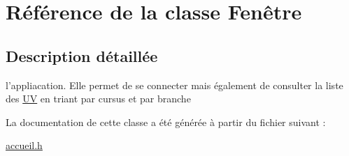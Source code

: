 \hypertarget{class_fen_xC3_xAAtre}{\section{Référence de la classe Fenêtre}
\label{class_fen_xC3_xAAtre}
}


\subsection{Description détaillée}
l'appliacation. Elle permet de se connecter mais également de consulter la liste des \hyperlink{class_u_v}{U\+V} en triant par cursus et par branche 

La documentation de cette classe a été générée à partir du fichier suivant \+:\begin{DoxyCompactItemize}
\item 
\hyperlink{accueil_8h}{accueil.\+h}\end{DoxyCompactItemize}
